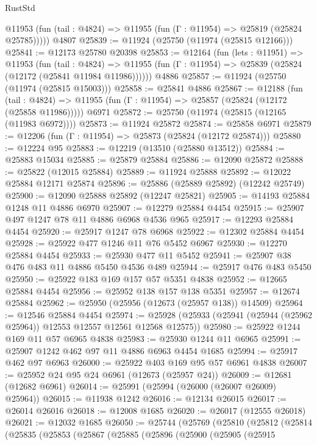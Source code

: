 \begin{lexlean}{RustStd}
\begin{coremodule}
{\begin{coremodule}
{{{{{{{{{{{{{{{{{{{{{{{{{{{{{{{{{{{{{{{{{{{{{{{{{{{{{{{{{{{{{{{{{{{{{{{{{{{{{{{{      @11953 (fun (tail : @4824) => @11955 (fun (Γ : @11954) => @25819 (@25824 @25785)))))
    @4807
@25839 := @11924 (@25750 (@11974 (@25815 @12166)))
@25841 := @12173 @25780 @20398
@25853 := @12164
    (fun (lets : @11951) =>
    @11953
      (fun (tail : @4824) =>
      @11955 (fun (Γ : @11954) => @25839 (@25824 (@12172 (@25841 @11984 @11986))))))
    @4886
@25857 := @11924 (@25750 (@11974 (@25815 @15003)))
@25858 := @25841 @4886
@25867 := @12188
    (fun (tail : @4824) => @11955 (fun (Γ : @11954) => @25857 (@25824 (@12172 (@25858 @11986)))))
    @6971
@25872 := @25750 (@11974 (@25815 (@12165 (@11983 @6972))))
@25873 := @11924 @25872
@25874 := @25858 @6971
@25879 := @12206 (fun (Γ : @11954) => @25873 (@25824 (@12172 @25874)))
@25880 := @12224 @95
@25883 := @12219 (@13510 (@25880 @13512))
@25884 := @25883 @15034
@25885 := @25879 @25884
@25886 := @12090 @25872
@25888 := @25822 (@12015 @25884)
@25889 := @11924 @25888
@25892 := @12022 @25884 @12171 @25874
@25896 := @25886 (@25889 @25892) (@12242 @25749)
@25900 := @12090 @25888 @25892 (@12247 @25821)
@25905 := @14193 @25884 @1248 @11 @4886 @6970
@25907 := @12279 @25884 @4454
@25915 := @25907 @497 @1247 @78 @11 @4886 @6968 @4536 @965
@25917 := @12293 @25884 @4454
@25920 := @25917 @1247 @78 @6968
@25922 := @12302 @25884 @4454
@25928 := @25922 @477 @1246 @11 @76 @5452 @6967
@25930 := @12270 @25884 @4454
@25933 := @25930 @477 @11 @5452
@25941 := @25907 @38 @476 @483 @11 @4886 @5450 @4536 @489
@25944 := @25917 @476 @483 @5450
@25950 := @25922 @183 @169 @157 @57 @5351 @4838
@25952 := @12665 @25884 @4454
@25956 := @25952 @138 @157 @138 @5351
@25957 := @12674 @25884
@25962 := @25950 (@25956 (@12673 (@25957 @138)) @14509)
@25964 := @12546 @25884 @4454
@25974 := @25928 (@25933 (@25941 (@25944 (@25962 @25964)) @12553 @12557 @12561 @12568 @12575))
@25980 := @25922 @1244 @169 @11 @57 @6965 @4838
@25983 := @25930 @1244 @11 @6965
@25991 := @25907 @1242 @462 @97 @11 @4886 @6963 @4454 @1685
@25994 := @25917 @462 @97 @6963
@26000 := @25922 @403 @169 @95 @57 @6961 @4838
@26007 := @25952 @24 @95 @24 @6961 (@12673 (@25957 @24))
@26009 := @12681 (@12682 @6961)
@26014 := @25991 (@25994 (@26000 (@26007 @26009) @25964))
@26015 := @11938 @1242
@26016 := @12134 @26015
@26017 := @26014 @26016
@26018 := @12008 @1685
@26020 := @26017 (@12555 @26018)
@26021 := @12032 @1685
@26050 := @25744
    (@25769
      (@25810
        (@25812
          (@25814
            (@25835
              (@25853
                (@25867
                  (@25885
                    (@25896
                      (@25900
                        (@25905
                          (@25915
}}}}}}}}}}}}}}}}}}}}}}}}}}}}}}}}}}}}}}}}}}}}}}}}}}}}}}}}}}}}}}}}}}}}}}}}}}}}}}}}
\end{coremodule}}
\end{coremodule}
\end{lexlean}
